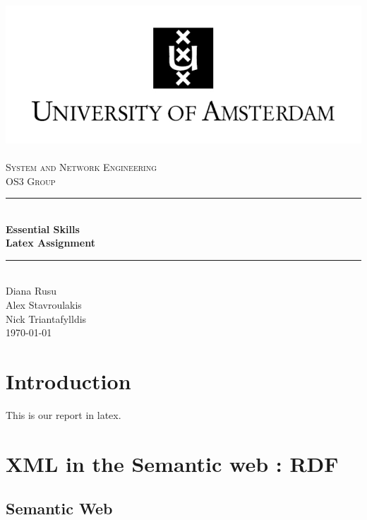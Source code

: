 \documentclass[a4paper,11pt]{report}
\newcommand{\HRule}{\rule{\linewidth}{0.5mm}}
\begin{document}
\begin{titlepage}

\begin{center}

\includegraphics{images/UvA-logo-2a.png}~\\[1cm]

\textsc{\LARGE System and Network Engineering\\ OS3 Group}\\[1.5cm]

\HRule \\

{ \huge \bfseries Essential Skills\\Latex Assignment}

\HRule \\[1cm]

\large{Diana Rusu} \\
\large{Alex Stavroulakis}\\
\large{Nick Triantafylldis}\\[11cm]

\today
\end{center}
\end{titlepage}

\tableofcontents

\chapter* {Introduction}

This is our report in latex.

\chapter{XML in the Semantic web : RDF}

\section{Semantic Web}
\end{document}
